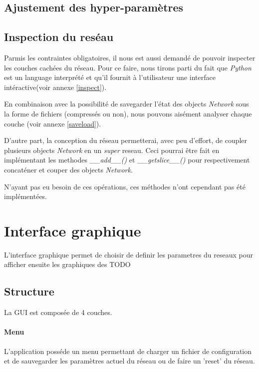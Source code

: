 \documentclass[11pt]{article}
\begin{document}
\subsection{Ajustement des hyper-param\`etres}

\subsection{Inspection du res\'eau}
Parmis les contraintes obligatoires, il nous est aussi demand\'e de pouvoir
inspecter les couches cach\'ees du r\'eseau. Pour ce faire, nous tirons parti du
fait que {\em Python} est un language interpr\'et\'e et qu'il fournit \`a
l'utilisateur une interface int\'eractive(voir annexe \ref{inspect}).

En combinaison avec la possibilit\'e de savegarder l'\'etat des
objects {\em Network} sous la forme de fichiers (compress\'es ou non), nous
pouvons ais\'ement analyser chaque couche (voir annexe \ref{saveload}).

D'autre part, la conception du r\'eseau permetterai, avec peu d'effort, de coupler
plusieurs objects {\em Network} en un {\em super} reseau.
Ceci pourrai \^etre fait en impl\'ementant les methodes {\em \_\_add\_\_()}
et {\em \_\_getslice\_\_()} pour respectivement concat\'ener et couper des objects
{\em Network}.

N'ayant pas eu besoin de ces op\'erations, ces m\'ethodes n'ont
cependant pas \'et\'e impl\'ement\'ees.

\section{Interface graphique}
L'interface graphique permet de choisir de definir les parametres du reseaux
pour afficher ensuite les graphiques des TODO
\subsection{Structure}
La GUI est compos\'ee de 4 couches.
\paragraph{Menu}
L'application poss\'ede un menu permettant de charger un fichier de
configuration et de sauvegarder les param\`etres actuel du r\'eseau ou de
faire un 'reset' du r\'eseau.
\end{document}
